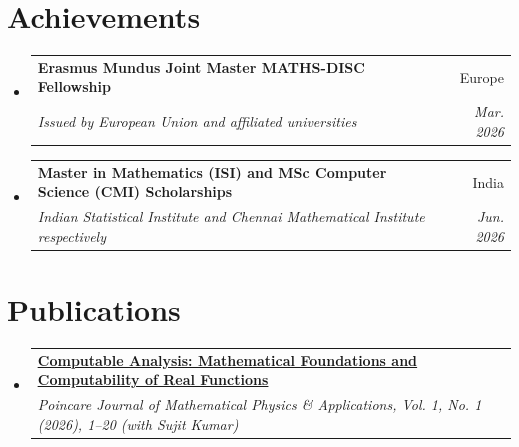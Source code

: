 \documentclass[letterpaper,11pt]{article}
\makeatletter
\newcommand{\resumeSubheading}[4]{
  \vspace{-2pt}\item
    \begin{tabular*}{0.97\textwidth}[t]{l@{\extracolsep{\fill}}r}
      \textbf{#1} & #2 \\
      \textit{\small#3} & \textit{\small #4} \\
    \end{tabular*}\vspace{-7pt}
}
\newcommand{\resumeSubHeadingListStart}{\begin{itemize}[leftmargin=0.15in, label={}]}
\newcommand{\resumeSubHeadingListEnd}{\end{itemize}}
\makeatother
\begin{document}
\section{Achievements}
\resumeSubHeadingListStart
\resumeSubheading
{Erasmus Mundus Joint Master MATHS-DISC Fellowship}{Europe}
{Issued by European Union and affiliated universities}{Mar. 2026}
\resumeSubheading
{Master in Mathematics (ISI) and MSc Computer Science (CMI) Scholarships}{India}
{Indian Statistical Institute and Chennai Mathematical Institute respectively}{Jun. 2026}

\resumeSubHeadingListEnd

\section{Publications}

\resumeSubHeadingListStart
\resumeSubheading
{\href{https://doi.org/10.46753/pjmpa.2026.v01i01.001}{\underline{\textbf{Computable Analysis: Mathematical Foundations and Computability of Real Functions}}}}{}
{Poincare Journal of Mathematical Physics \& Applications, Vol. 1, No. 1 (2026), 1--20 (with Sujit Kumar)}{}
\resumeSubHeadingListEnd

\end{document}

